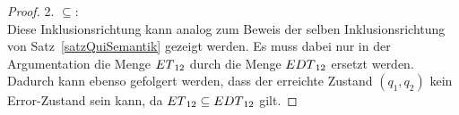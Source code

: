\begin{proof}

  2. \glqq{}$\subseteq$\grqq{}:\\
  Diese Inklusionsrichtung kann analog zum Beweis der selben Inklusionsrichtung
  von Satz~\ref{satzQuiSemantik} gezeigt werden. Es muss dabei nur in der
  Argumentation die Menge $ET{}_{12}$ durch die Menge $EDT{}_{12}$ ersetzt
  werden. Dadurch kann ebenso gefolgert werden, dass der erreichte Zustand
  $(q_1,q_2)$ kein Error-Zustand sein kann, da $ET{}_{12}\subseteq
  EDT{}_{12}$ gilt.


\end{proof}
